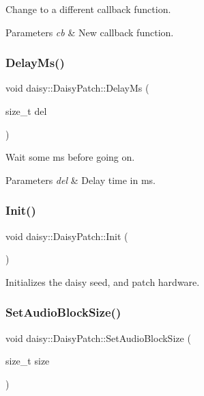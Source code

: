 Change to a different callback function. 
\begin{DoxyParams}{Parameters}
{\em cb} & New callback function. \\
\hline
\end{DoxyParams}
\mbox{\label{classdaisy_1_1_daisy_patch_ad1d37ebfcfe6e45f7a4e334ea8409c5a}} 
\subsubsection{\texorpdfstring{Delay\+Ms()}{DelayMs()}}
{\footnotesize\ttfamily void daisy\+::\+Daisy\+Patch\+::\+Delay\+Ms (\begin{DoxyParamCaption}\item[{size\+\_\+t}]{del }\end{DoxyParamCaption})}

Wait some ms before going on. 
\begin{DoxyParams}{Parameters}
{\em del} & Delay time in ms. \\
\hline
\end{DoxyParams}
\mbox{\label{classdaisy_1_1_daisy_patch_a2c7ab184dfc412238675046969cbbd17}} 
\subsubsection{\texorpdfstring{Init()}{Init()}}
{\footnotesize\ttfamily void daisy\+::\+Daisy\+Patch\+::\+Init (\begin{DoxyParamCaption}{ }\end{DoxyParamCaption})}

Initializes the daisy seed, and patch hardware. \mbox{\label{classdaisy_1_1_daisy_patch_a3eb9d0267312bbe4997124afc9d75b89}} 
\subsubsection{\texorpdfstring{Set\+Audio\+Block\+Size()}{SetAudioBlockSize()}}
{\footnotesize\ttfamily void daisy\+::\+Daisy\+Patch\+::\+Set\+Audio\+Block\+Size (\begin{DoxyParamCaption}\item[{size\+\_\+t}]{size }\end{DoxyParamCaption})}

